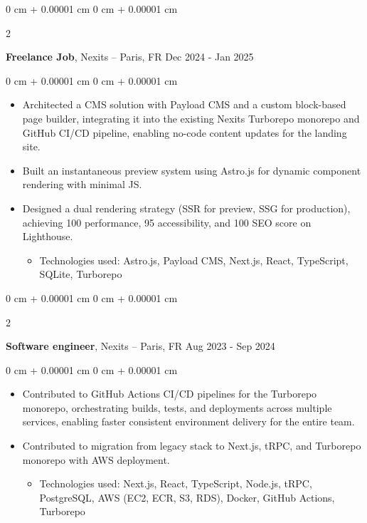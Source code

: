 \documentclass[10pt, letterpaper]{article}
\newenvironment{highlights}{
  \begin{itemize}[
    topsep=0.10 cm,
    parsep=0.10 cm,
    partopsep=0pt,
    itemsep=0pt,
    leftmargin=0 cm + 10pt
    ]
  }{
\end{itemize}
}
\newenvironment{highlightsforbulletentries}{
  \begin{itemize}[
    topsep=0 cm,
    parsep=0.10 cm,
    partopsep=0pt,
    itemsep=0pt,
    leftmargin=10pt
    ]
  }{
\end{itemize}
} %
\newenvironment{onecolentry}{
  \begin{adjustwidth}{
      0 cm + 0.00001 cm
    }{
      0 cm + 0.00001 cm
    }
  }{
  \end{adjustwidth}
} %
\newenvironment{twocolentry}[2][]{
  \onecolentry
  \def\secondColumn{#2}
  \setcolumnwidth{\fill, 4.5 cm}
  \begin{paracol}{2}
  }{
    \switchcolumn \raggedleft \secondColumn
  \end{paracol}
  \end{onecolentry}
} %
\begin{document}
  \vspace{0.2 cm}

  \begin{twocolentry}{
      Dec 2024 - Jan 2025
    }
  \textbf{Freelance Job}, Nexits  -- Paris, FR\end{twocolentry}

  \vspace{0.10 cm}
  \begin{onecolentry}
    \begin{highlights}
\item Architected a CMS solution with Payload CMS and a custom block-based page builder, integrating it into the existing Nexits Turborepo monorepo and GitHub CI/CD pipeline, enabling no-code content updates for the landing site.
  \item Built an instantaneous preview system using Astro.js for dynamic component rendering with minimal JS.
  \item Designed a dual rendering strategy (SSR for preview, SSG for production), achieving 100 performance, 95 accessibility, and 100 SEO score on Lighthouse.

          \begin{highlightsforbulletentries}
    \item Technologies used: Astro.js, Payload CMS, Next.js, React, TypeScript, SQLite, Turborepo
    \end{highlightsforbulletentries}

    \end{highlights}

  \end{onecolentry}




  \begin{twocolentry}{
      Aug 2023 - Sep 2024
    }
  \textbf{Software engineer}, Nexits  -- Paris, FR\end{twocolentry}

  \vspace{0.10 cm}
  \begin{onecolentry}
    \begin{highlights}

\item Contributed to GitHub Actions CI/CD pipelines for the Turborepo monorepo, orchestrating builds, tests, and deployments across multiple services, enabling faster consistent environment delivery for the entire team.
  \item Contributed to migration from legacy stack to Next.js, tRPC, and Turborepo monorepo with AWS deployment.

                \begin{highlightsforbulletentries}
    \item Technologies used: Next.js, React, TypeScript, Node.js, tRPC, PostgreSQL, AWS (EC2, ECR, S3, RDS), Docker, GitHub Actions, Turborepo
    \end{highlightsforbulletentries}


    \end{highlights}

  \end{onecolentry}
\end{document}
